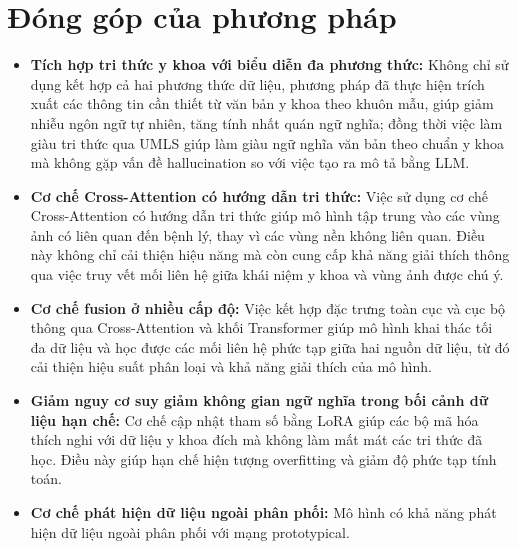 \section{Đóng góp của phương pháp}
\begin{itemize}
    \item \textbf{Tích hợp tri thức y khoa với biểu diễn đa phương thức:} Không chỉ sử dụng kết hợp cả hai phương thức dữ liệu, 
    phương pháp đã thực hiện trích xuất các thông tin cần thiết từ văn bản y khoa theo khuôn mẫu, giúp giảm nhiễu ngôn ngữ tự nhiên, tăng tính nhất quán ngữ nghĩa; 
    đồng thời việc làm giàu tri thức qua UMLS giúp làm giàu ngữ nghĩa văn bản theo chuẩn y khoa mà không gặp vấn đề hallucination so với việc tạo ra mô tả bằng LLM.
    \item \textbf{Cơ chế Cross-Attention có hướng dẫn tri thức:} Việc sử dụng cơ chế Cross-Attention có hướng dẫn tri thức giúp mô hình tập trung vào các vùng ảnh có liên quan đến bệnh lý, 
    thay vì các vùng nền không liên quan. Điều này không chỉ cải thiện hiệu năng mà còn cung cấp khả năng giải thích thông qua việc truy vết mối liên hệ giữa khái niệm y khoa và vùng ảnh được chú ý.
    \item \textbf{Cơ chế fusion ở nhiều cấp độ:} Việc kết hợp đặc trưng toàn cục và cục bộ thông qua Cross-Attention và khối Transformer giúp mô hình khai thác tối đa dữ liệu 
    và học được các mối liên hệ phức tạp giữa hai nguồn dữ liệu, từ đó cải thiện hiệu suất phân loại và khả năng giải thích của mô hình.
    \item \textbf{Giảm nguy cơ suy giảm không gian ngữ nghĩa trong bối cảnh dữ liệu hạn chế:} 
Cơ chế cập nhật tham số bằng LoRA giúp các bộ mã hóa thích nghi với dữ liệu y khoa đích mà không làm mất mát các tri thức đã học. Điều này giúp hạn chế hiện tượng overfitting và giảm độ phức tạp tính toán.
    \item \textbf{Cơ chế phát hiện dữ liệu ngoài phân phối:} Mô hình có khả năng phát hiện dữ liệu ngoài phân phối với mạng prototypical.
\end{itemize}
